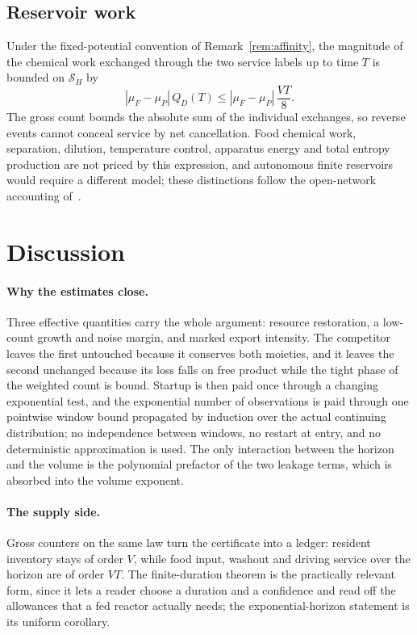 \documentclass[11pt,a4paper]{article}
\theoremstyle{plain}
\theoremstyle{definition}
\theoremstyle{remark}
\newcommand{\Son}{\mathcal S}
\begin{document}
\subsection{Reservoir work}
Under the fixed-potential convention of Remark~\ref{rem:affinity}, the magnitude of the chemical work exchanged through the two service labels up to time $T$ is bounded on $\Son_H$ by
\[
 |\mu_F-\mu_P|\,Q_D(T)\le|\mu_F-\mu_P|\,\frac{VT}8 .
\]
The gross count bounds the absolute sum of the individual exchanges, so reverse events cannot conceal service by net cancellation. Food chemical work, separation, dilution, temperature control, apparatus energy and total entropy production are not priced by this expression, and autonomous finite reservoirs would require a different model; these distinctions follow the open-network accounting of~\citep{rao2018}.

\section{Discussion}\label{sec:discussion}

\paragraph{Why the estimates close.}
Three effective quantities carry the whole argument: resource restoration, a low-count growth and noise margin, and marked export intensity. The competitor leaves the first untouched because it conserves both moieties, and it leaves the second unchanged because its loss falls on free product while the tight phase of the weighted count is bound. Startup is then paid once through a changing exponential test, and the exponential number of observations is paid through one pointwise window bound propagated by induction over the actual continuing distribution; no independence between windows, no restart at entry, and no deterministic approximation is used. The only interaction between the horizon and the volume is the polynomial prefactor of the two leakage terms, which is absorbed into the volume exponent.

\paragraph{The supply side.}
Gross counters on the same law turn the certificate into a ledger: resident inventory stays of order $V$, while food input, washout and driving service over the horizon are of order $VT$. The finite-duration theorem is the practically relevant form, since it lets a reader choose a duration and a confidence and read off the allowances that a fed reactor actually needs; the exponential-horizon statement is its uniform corollary.
\end{document}
